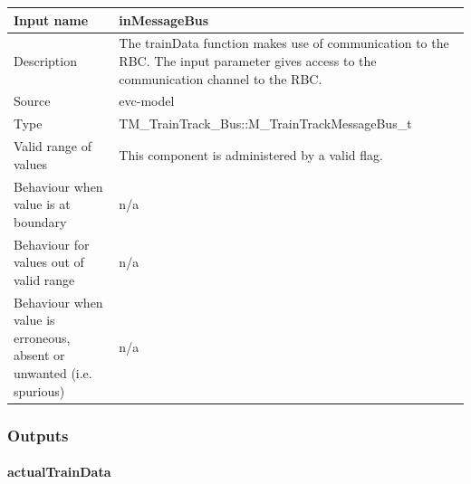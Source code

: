\begin{longtable}{p{}p{}}
\toprule
Input name				& inMessageBus\\
\midrule
Description				& The trainData function makes use of communication to the RBC. The input parameter gives access to the communication channel to the RBC.
\\
\midrule
Source					& evc-model\\  
\midrule
Type					& TM\_TrainTrack\_Bus::M\_TrainTrackMessageBus\_t\\
\midrule
Valid range of values	& This component is administered by a valid flag.\\
\midrule
Behaviour when value is at boundary	& n/a\\
\midrule
Behaviour for values out of valid range	& n/a\\
\midrule
Behaviour when value is erroneous, absent or unwanted (i.e. spurious) & n/a\\
\bottomrule
\end{longtable}

\subsubsection{Outputs}\label{s:traindata_outputs}

\paragraph{actualTrainData}

